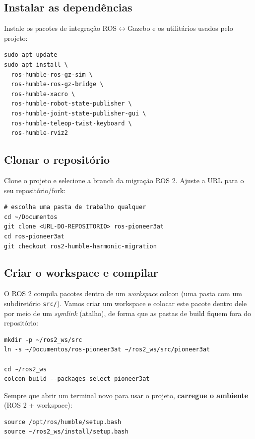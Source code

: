 \documentclass[11pt,a4paper]{article}
\begin{document}
\subsection{Instalar as dependências}

Instale os pacotes de integração ROS$\leftrightarrow$Gazebo e os utilitários
usados pelo projeto:

\begin{lstlisting}
sudo apt update
sudo apt install \
  ros-humble-ros-gz-sim \
  ros-humble-ros-gz-bridge \
  ros-humble-xacro \
  ros-humble-robot-state-publisher \
  ros-humble-joint-state-publisher-gui \
  ros-humble-teleop-twist-keyboard \
  ros-humble-rviz2
\end{lstlisting}

\subsection{Clonar o repositório}

Clone o projeto e selecione a branch da migração ROS 2. Ajuste a URL para o seu
repositório/fork:

\begin{lstlisting}
# escolha uma pasta de trabalho qualquer
cd ~/Documentos
git clone <URL-DO-REPOSITORIO> ros-pioneer3at
cd ros-pioneer3at
git checkout ros2-humble-harmonic-migration
\end{lstlisting}

\subsection{Criar o workspace e compilar}

O ROS 2 compila pacotes dentro de um \emph{workspace} colcon (uma pasta com um
subdiretório \texttt{src/}). Vamos criar um workspace e colocar este pacote
dentro dele por meio de um \emph{symlink} (atalho), de forma que as pastas de
build fiquem fora do repositório:

\begin{lstlisting}
mkdir -p ~/ros2_ws/src
ln -s ~/Documentos/ros-pioneer3at ~/ros2_ws/src/pioneer3at

cd ~/ros2_ws
colcon build --packages-select pioneer3at
\end{lstlisting}

\noindent
Sempre que abrir um terminal novo para usar o projeto, \textbf{carregue o
ambiente} (ROS 2 + workspace):

\begin{lstlisting}
source /opt/ros/humble/setup.bash
source ~/ros2_ws/install/setup.bash
\end{lstlisting}
\end{document}
